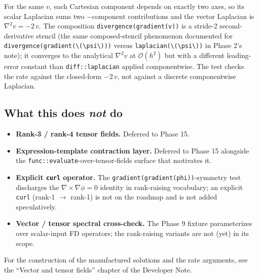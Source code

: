 For the same \(v\), each Cartesian component depends on exactly two
axes, so its scalar Laplacian sums two
\(-\text{component}\) contributions and the vector Laplacian is
\(\nabla^2 v = -2\,v\). The composition
\passthrough{\lstinline!divergence(gradient(v))!} is a stride-2
second-derivative stencil (the same composed-stencil phenomenon
documented for \passthrough{\lstinline!divergence(gradient(\(\psi\)))!} versus
\passthrough{\lstinline!laplacian(\(\psi\))!} in Phase 2's note); it converges
to the analytical \(\nabla^2 v\) at \(\mathcal{O}(h^2)\) but with a
different leading-error constant than
\passthrough{\lstinline!diff::laplacian!} applied componentwise. The
test checks the rate against the closed-form
\(-2\,v\), not against a discrete componentwise Laplacian.

\subsection{What this does \emph{not} do}\label{phase13-not-do}

\begin{itemize}
\tightlist
\item
  \textbf{Rank-3 / rank-4 tensor fields.} Deferred to Phase 15.
\item
  \textbf{Expression-template contraction layer.} Deferred to Phase 15
  alongside the
  \passthrough{\lstinline!func::evaluate!}-over-tensor-fields surface
  that motivates it.
\item
  \textbf{Explicit \texttt{curl} operator.} The
  \passthrough{\lstinline!gradient(gradient(phi))!}-symmetry test
  discharges the
  \(\nabla\times\nabla\phi = 0\) identity in rank-raising
  vocabulary; an explicit
  \passthrough{\lstinline!curl!} (rank-1 \(\to\) rank-1) is not on
  the roadmap and is not added speculatively.
\item
  \textbf{Vector / tensor spectral cross-check.} The Phase 9 fixture
  parameterizes over scalar-input FD operators; the rank-raising
  variants are not (yet) in its scope.
\end{itemize}

For the construction of the manufactured solutions and the rate
arguments, see the ``Vector and tensor fields'' chapter of the
Developer Note.
